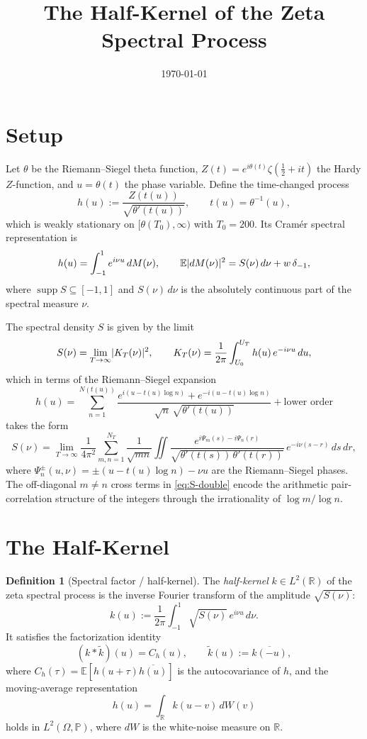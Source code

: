 \documentclass[11pt,reqno]{amsart}
\title{The Half-Kernel of the Zeta Spectral Process}
\date{\today}
\theoremstyle{definition}
\newtheorem{definition}[theorem]{Definition}
\theoremstyle{remark}
\DeclareMathOperator{\supp}{supp}
\DeclarePairedDelimiter{\abs}{\lvert}{\rvert}
\begin{document}
\maketitle

\section{Setup}

Let \(\theta\) be the Riemann--Siegel theta function, \(Z(t)=e^{i\theta(t)}\zeta(\tfrac{1}{2}+it)\)
the Hardy \(Z\)-function, and \(u=\theta(t)\) the phase variable. Define the
time-changed process
\[
  h(u) := \frac{Z(t(u))}{\sqrt{\theta'(t(u))}},
  \qquad t(u) = \theta^{-1}(u),
\]
which is weakly stationary on \([\theta(T_0),\infty)\) with \(T_0=200\).
Its Cram\'{e}r spectral representation is
\[
  h(u) = \int_{-1}^{1} e^{i\nu u}\,dM(\nu),
  \qquad \mathbb{E}\abs{dM(\nu)}^2 = S(\nu)\,d\nu + w\,\delta_{-1},
\]
where \(\supp S \subseteq [-1,1]\) and \(S(\nu)\,d\nu\) is the absolutely
continuous part of the spectral measure \(\nu\).

The spectral density \(S\) is given by the limit
\begin{equation}\label{eq:S}
  S(\nu) = \lim_{T\to\infty} \abs{K_T(\nu)}^2,
  \qquad
  K_T(\nu) = \frac{1}{2\pi}\int_{U_0}^{U_T} h(u)\,e^{-i\nu u}\,du,
\end{equation}
which in terms of the Riemann--Siegel expansion
\[
  h(u) = \sum_{n=1}^{N(t(u))}
    \frac{e^{i(u-t(u)\log n)}+e^{-i(u-t(u)\log n)}}{\sqrt{n}\,\sqrt{\theta'(t(u))}}
  + \text{lower order}
\]
takes the form
\begin{equation}\label{eq:S-double}
  S(\nu) = \lim_{T\to\infty} \frac{1}{4\pi^2}
  \sum_{m,n=1}^{N_T} \frac{1}{\sqrt{mn}}
  \iint \frac{e^{i\Psi_m(s)-i\Psi_n(r)}}
             {\sqrt{\theta'(t(s))\,\theta'(t(r))}}
  \,e^{-i\nu(s-r)}\,ds\,dr,
\end{equation}
where \(\Psi_n^\pm(u,\nu) = \pm(u-t(u)\log n) - \nu u\) are the
Riemann--Siegel phases. The off-diagonal \(m\neq n\) cross terms in
\eqref{eq:S-double} encode the arithmetic pair-correlation structure of
the integers through the irrationality of \(\log m/\log n\).

\section{The Half-Kernel}

\begin{definition}[Spectral factor / half-kernel]\label{def:halfkernel}
The \emph{half-kernel} \(k\in L^2(\mathbb{R})\) of the zeta spectral process
is the inverse Fourier transform of the amplitude \(\sqrt{S(\nu)}\):
\[
  k(u) := \frac{1}{2\pi}\int_{-1}^{1} \sqrt{S(\nu)}\,e^{i\nu u}\,d\nu.
\]
It satisfies the factorization identity
\[
  (k * \tilde{k})(u) = C_h(u),
  \qquad \tilde{k}(u) := \overline{k(-u)},
\]
where \(C_h(\tau) = \mathbb{E}[h(u+\tau)\overline{h(u)}]\) is the
autocovariance of \(h\), and the moving-average representation
\[
  h(u) = \int_{\mathbb{R}} k(u-v)\,dW(v)
\]
holds in \(L^2(\Omega,\mathbb{P})\), where \(dW\) is the white-noise measure
on \(\mathbb{R}\).
\end{definition}
\end{document}
